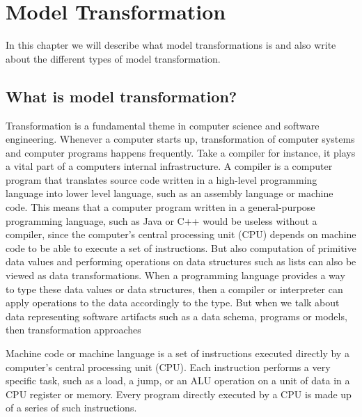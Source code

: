 
\chapter{Model Transformation} %

\label{Chapte3} %


In this chapter we will describe what model transformations is and also write
about the different types of model transformation. 

\section{What is model transformation?}

Transformation is a fundamental theme in computer science and software
engineering. Whenever a computer starts up, transformation of computer systems
and computer programs happens frequently. Take a compiler for instance, it plays
a vital part of a computers internal infrastructure. A compiler is a computer
program that translates source code written in a high-level programming
language into lower level language, such as an assembly language or machine
code. This means that a computer program written in a general-purpose
programming language, such as Java or C++ would be useless without a compiler,
since the computer's central processing unit (CPU) depends on machine code to be
able to execute a set of instructions. But also computation of primitive data
values and performing operations on data structures such as lists can also be
viewed as data transformations. When a programming language provides a way
to type these data values or data structures, then a compiler or interpreter can
apply operations to the data accordingly to the type. But when we talk about
data representing software artifacts such as a data schema, programs or models,
then transformation approaches 

Machine code or machine language is a set of instructions executed directly by a
computer's central processing unit (CPU). Each instruction performs a very
specific task, such as a load, a jump, or an ALU operation on a unit of data in
a CPU register or memory. Every program directly executed by a CPU is made up
of a series of such instructions.

